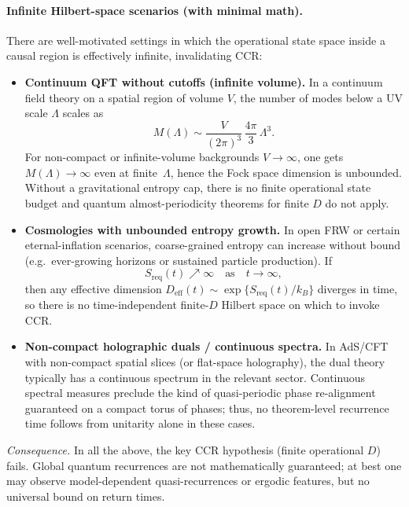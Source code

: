 \documentclass[12pt]{article}
\theoremstyle{remark}
\begin{document}
\paragraph{Infinite Hilbert-space scenarios (with minimal math).}
There are well-motivated settings in which the operational state space inside a causal region
is effectively infinite, invalidating CCR:
\begin{itemize}
  \item \textbf{Continuum QFT without cutoffs (infinite volume).}
  In a continuum field theory on a spatial region of volume $V$, the number of modes below a UV scale $\Lambda$
  scales as
  \[
     M(\Lambda) \sim \frac{V}{(2\pi)^3}\,\frac{4\pi}{3}\,\Lambda^3.
  \]
  For non-compact or infinite-volume backgrounds $V\to\infty$, one gets $M(\Lambda)\to\infty$ even at finite~$\Lambda$,
  hence the Fock space dimension is unbounded. Without a gravitational entropy cap, there is no finite
  operational state budget and quantum almost-periodicity theorems for finite $D$ do not apply.

  \item \textbf{Cosmologies with unbounded entropy growth.}
  In open FRW or certain eternal-inflation scenarios, coarse-grained entropy can increase without bound
  (e.g.\ ever-growing horizons or sustained particle production). If
  \[
     S_{\text{req}}(t)\nearrow\infty\quad\text{as}\quad t\to\infty,
  \]
  then any effective dimension $D_{\mathrm{eff}}(t)\sim \exp\{S_{\text{req}}(t)/k_B\}$ diverges in time, so there is
  no time-independent finite-$D$ Hilbert space on which to invoke CCR.

  \item \textbf{Non-compact holographic duals / continuous spectra.}
  In AdS/CFT with non-compact spatial slices (or flat-space holography), the dual theory typically has
  a continuous spectrum in the relevant sector. Continuous spectral measures preclude the kind of
  quasi-periodic phase re-alignment guaranteed on a compact torus of phases; thus, no theorem-level
  recurrence time follows from unitarity alone in these cases.
\end{itemize}

\noindent\emph{Consequence.} In all the above, the key CCR hypothesis (finite operational $D$) fails.
Global quantum recurrences are not mathematically guaranteed; at best one may observe model-dependent
quasi-recurrences or ergodic features, but no universal bound on return times.
\end{document}
